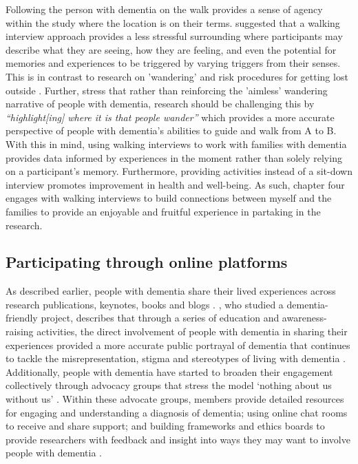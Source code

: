 Following the person with dementia on the walk provides a sense of agency within the study where the location is on their terms. \cite{kullberg2017walking}  suggested that a walking interview approach provides a less stressful surrounding where participants may describe what they are seeing, how they are feeling, and even the potential for memories and experiences to be triggered by varying triggers from their senses. This is in contrast to research on 'wandering' and risk procedures for getting lost outside \citep{odzakovic2020verjoyed}. Further, \cite{brittain2017walking} stress that rather than reinforcing the 'aimless' wandering narrative of people with dementia, research should be challenging this by \textit{``highlight[ing] where it is that people wander''} which provides a more accurate perspective of people with dementia's abilities to guide and walk from A to B. With this in mind, using walking interviews to work with families with dementia provides data informed by experiences in the moment rather than solely relying on a participant's memory. Furthermore, providing activities instead of a sit-down interview promotes improvement in health and well-being. As such, chapter four engages with walking interviews to build connections between myself and the families to provide an enjoyable and fruitful experience in partaking in the research.

\subsection{Participating through online platforms}
\label{PD:onlinePlatform}
As described earlier, people with dementia share their lived experiences across research publications, keynotes, books and blogs \citep{bryden_challenging_2020, shakespeare_rights_2019}. \cite{phillipson2019involvement}, who studied a dementia-friendly project, describes that through a series of education and awareness-raising activities, the direct involvement of people with dementia in sharing their experiences provided a more accurate public portrayal of dementia that continues to tackle the misrepresentation, stigma and stereotypes of living with dementia \citep{herrmann_systematic_2018}. Additionally, people with dementia have started to broaden their engagement collectively through advocacy groups that stress the model `nothing about us without us' \citep{oldfield2021nothing}. Within these advocate groups, members provide detailed resources for engaging and understanding a diagnosis of dementia; using online chat rooms to receive and share support; and building frameworks and ethics boards to provide researchers with feedback and insight into ways they may want to involve people with dementia \citep{davies2021dementia}.

